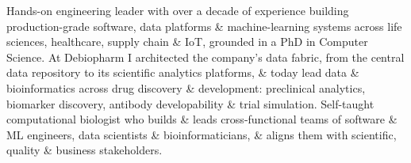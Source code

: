 
\begin{cvparagraph}
Hands-on engineering leader with over a decade of experience building production-grade software, data platforms \& machine-learning systems across life sciences, healthcare, supply chain \& IoT, grounded in a PhD in Computer Science. At Debiopharm I architected the company's data fabric, from the central data repository to its scientific analytics platforms, \& today lead data \& bioinformatics across drug discovery \& development: preclinical analytics, biomarker discovery, antibody developability \& trial simulation. Self-taught computational biologist who builds \& leads cross-functional teams of software \& ML engineers, data scientists \& bioinformaticians, \& aligns them with scientific, quality \& business stakeholders.
\end{cvparagraph}

\vspace{-0.4cm}
